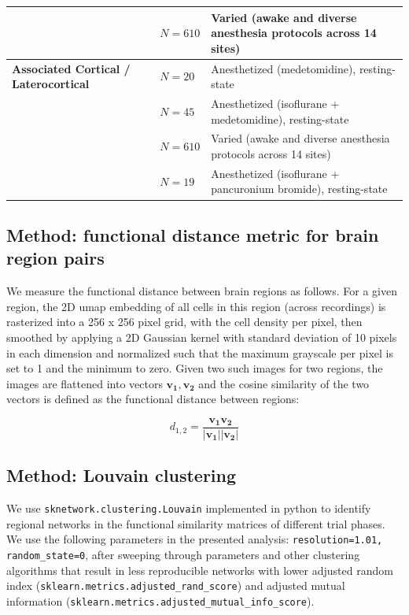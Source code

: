 \begin{table}[htbp]
\begin{tabularx}{\textwidth}{l l l X}
  & \cite{fmri_Grandjean2020} & $N = 610$ & Varied (awake and diverse anesthesia protocols across 14 sites) \\
\midrule
\textbf{Associated Cortical / Laterocortical} 
  & \cite{fmri_Zerbi2015} & $N = 20$ & Anesthetized (medetomidine), resting-state \\
  & \cite{fmri_Grandjean2017} & $N = 45$ & Anesthetized (isoflurane + medetomidine), resting-state \\
  & \cite{fmri_Grandjean2020} & $N = 610$ & Varied (awake and diverse anesthesia protocols across 14 sites) \\
  & \cite{fmri_Vafaii2024} & $N = 19$ & Anesthetized (isoflurane + pancuronium bromide), resting-state \\
\bottomrule
\end{tabularx}
\end{table}



\subsection{Method: functional distance metric for brain region pairs}

We measure the functional distance between brain regions as follows. For a given region, the 2D umap embedding of all cells in this region (across recordings) is rasterized into a 256 x 256 pixel grid, with the cell density per pixel, then smoothed by applying a 2D Gaussian kernel with standard deviation of 10 pixels in each dimension and normalized such that the maximum grayscale per pixel is set to 1 and the minimum to zero. Given two such images for two regions, the images are flattened into vectors $\mathbf{v_1}, \mathbf{v_2}$ and the cosine similarity of the two vectors is defined as the functional distance between regions:

\[d_{1,2} = \frac{\mathbf{v_1} \mathbf{v_2}}{|\mathbf{v_1}| |\mathbf{v_2}|} \]


\subsection{Method: Louvain clustering}
We use \verb|sknetwork.clustering.Louvain| implemented in python to identify regional networks in the functional similarity matrices of different trial phases. We use the following parameters in the presented analysis: \verb|resolution=1.01, random_state=0|, after sweeping through parameters and other clustering algorithms that result in less reproducible networks with lower adjusted random index (\verb|sklearn.metrics.adjusted_rand_score|) and adjusted mutual information (\verb|sklearn.metrics.adjusted_mutual_info_score|). 

